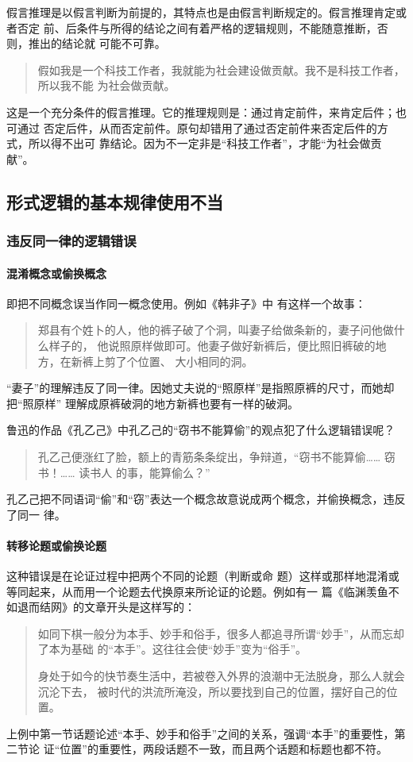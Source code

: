 \documentclass[final,oneside]{ctexbook}
\newenvironment{equotation}{\begin{quotation}\kaishu}{\end{quotation}}
\begin{document}
假言推理是以假言判断为前提的，其特点也是由假言判断规定的。假言推理肯定或者否定
前、后条件与所得的结论之间有着严格的逻辑规则，不能随意推断，否则，推出的结论就
可能不可靠。
\begin{equotation}
  假如我是一个科技工作者，我就能为社会建设做贡献。我不是科技工作者，所以我不能
  为社会做贡献。
\end{equotation}
这是一个充分条件的假言推理。它的推理规则是：通过肯定前件，来肯定后件；也可通过
否定后件，从而否定前件。原句却错用了通过否定前件来否定后件的方式，所以得不出可
靠结论。因为不一定非是“科技工作者”，才能“为社会做贡献”。

\subsection{形式逻辑的基本规律使用不当}

\subsubsection{违反同一律的逻辑错误}

 
\paragraph{混淆概念或偷换概念}即把不同概念误当作同一概念使用。例如《韩非子》中
有这样一个故事：
\begin{equotation}
  郑县有个姓卜的人，他的裤子破了个洞，叫妻子给做条新的，妻子问他做什么样子的，
  他说照原样做即可。他妻子做好新裤后，便比照旧裤破的地方，在新裤上剪了个位置、
  大小相同的洞。
\end{equotation}
“妻子”的理解违反了同一律。因她丈夫说的“照原样”是指照原裤的尺寸，而她却把“照原样”
理解成原裤破洞的地方新裤也要有一样的破洞。

鲁迅的作品《孔乙己》中孔乙己的“窃书不能算偷”的观点犯了什么逻辑错误呢？
\begin{equotation}
  孔乙己便涨红了脸，额上的青筋条条绽出，争辩道，“窃书不能算偷…… 窃书！…… 读书人
  的事，能算偷么？”
\end{equotation}
孔乙己把不同语词“偷”和“窃”表达一个概念故意说成两个概念，并偷换概念，违反了同一
律。

 
\paragraph{转移论题或偷换论题}这种错误是在论证过程中把两个不同的论题（判断或命
题）这样或那样地混淆或等同起来，从而用一个论题去代换原来所论证的论题。例如有一
篇《临渊羡鱼不如退而结网》的文章开头是这样写的：
\begin{equotation}
  如同下棋一般分为本手、妙手和俗手，很多人都追寻所谓“妙手”，从而忘却了本为基础
  的“本手”。这往往会使“妙手”变为“俗手”。

  身处于如今的快节奏生活中，若被卷入外界的浪潮中无法脱身，那么人就会沉沦下去，
  被时代的洪流所淹没，所以要找到自己的位置，摆好自己的位置。
\end{equotation}
上例中第一节话题论述“本手、妙手和俗手”之间的关系，强调“本手”的重要性，第二节论
证“位置”的重要性，两段话题不一致，而且两个话题和标题也都不符。
\end{document}
